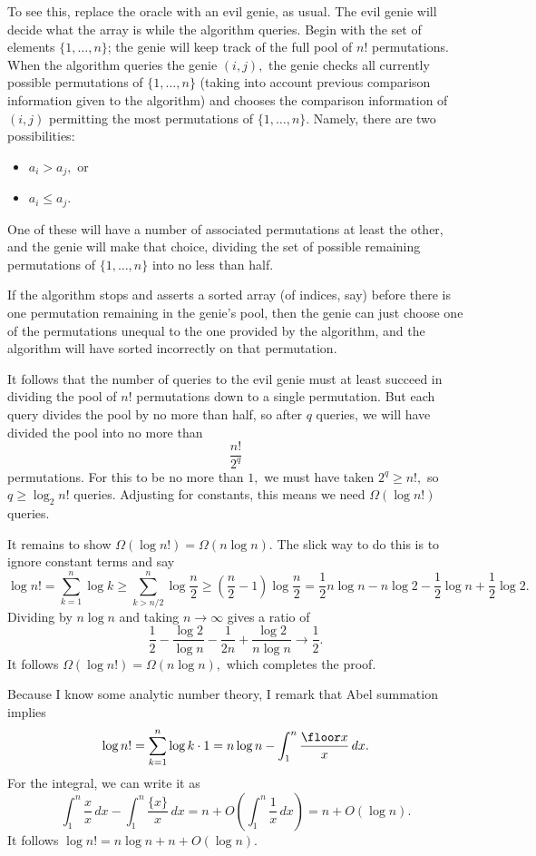 To see this, replace the oracle with an evil genie, as usual. The evil genie will decide what the array is while the algorithm queries. Begin with the set of elements $\{1,\ldots,n\}$; the genie will keep track of the full pool of $n!$ permutations. When the algorithm queries the genie $(i,j),$ the genie checks all currently possible permutations of $\{1,\ldots,n\}$ (taking into account previous comparison information given to the algorithm) and chooses the comparison information of $(i,j)$ permitting the most permutations of $\{1,\ldots,n\}$. Namely, there are two possibilities:
\begin{itemize}
    \item $a_i>a_j,$ or
    \item $a_i\le a_j.$
\end{itemize}
One of these will have a number of associated permutations at least the other, and the genie will make that choice, dividing the set of possible remaining permutations of $\{1,\ldots,n\}$ into no less than half.

If the algorithm stops and asserts a sorted array (of indices, say) before there is one permutation remaining in the genie's pool, then the genie can just choose one of the permutations unequal to the one provided by the algorithm, and the algorithm will have sorted incorrectly on that permutation.

It follows that the number of queries to the evil genie must at least succeed in dividing the pool of $n!$ permutations down to a single permutation. But each query divides the pool by no more than half, so after $q$ queries, we will have divided the pool into no more than
\[\frac{n!}{2^q}\]
permutations. For this to be no more than $1,$ we must have taken $2^q\ge n!,$ so $q\ge\log_2n!$ queries. Adjusting for constants, this means we need $\Omega(\log n!)$ queries.

It remains to show $\Omega(\log n!)=\Omega(n\log n).$ The slick way to do this is to ignore constant terms and say
\[\log n!=\sum_{k=1}^n\log k\ge\sum_{k>n/2}^n\log\frac n2\ge\left(\frac n2-1\right)\log\frac n2=\frac12n\log n-n\log2-\frac12\log n+\frac12\log2.\]
Dividing by $n\log n$ and taking $n\to\infty$ gives a ratio of
\[\frac12-\frac{\log2}{\log n}-\frac1{2n}+\frac{\log2}{n\log n}\longrightarrow\frac12.\]
It follows $\Omega(\log n!)=\Omega(n\log n),$ which completes the proof.

Because I know some analytic number theory, I remark that Abel summation implies
\[\log n!=\sum_{k=1}^n\log k\cdot1=n\log n-\int_1^n\frac{\floor x}x\,dx.\]
For the integral, we can write it as
\[\int_1^n\frac xx\,dx-\int_1^n\frac{\{x\}}x\,dx=n+O\left(\int_1^n\frac1x\,dx\right)=n+O(\log n).\]
It follows $\log n!=n\log n+n+O(\log n).$

